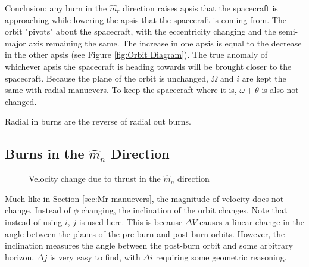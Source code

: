 \documentclass{article}
\begin{document}
Conclusion: any burn in the $\hat{m}_r$ direction raises apsis that the spacecraft is approaching while lowering the apsis that the spacecraft is coming from. The orbit "pivots" about the spacecraft, with the eccentricity changing and the semi-major axis remaining the same. The increase in one apsis is equal to the decrease in the other apsis (see Figure \ref{fig:Orbit Diagram}). The true anomaly of whichever apsis the spacecraft is heading towards will be brought closer to the spacecraft. Because the plane of the orbit is unchanged, $\Omega$ and $i$ are kept the same with radial manuevers. To keep the spacecraft where it is, $\omega+\theta$ is also not changed.

Radial in burns are the reverse of radial out burns.

\bigskip\bigskip
\subsection{Burns in the \texorpdfstring{$\hat{m}_n$}{Normal} Direction}\label{sec:Mn Manuever}

\begin{figure}[H]
    \centering
    \caption{Velocity change due to thrust in the $\hat{m}_n$ direction}\label{fig:dV Triangle Mn}
\end{figure}

Much like in Section \ref{sec:Mr manuevers}, the magnitude of velocity does not change. Instead of $\phi$ changing, the inclination of the orbit changes. Note that instead of using $i$, $j$ is used here. This is because $\Delta V$ causes a linear change in the angle between the planes of the pre-burn and post-burn orbits. However, the inclination measures the angle between the post-burn orbit and some arbitrary horizon. $\Delta j$ is very easy to find, with $\Delta i$ requiring some geometric reasoning.
\end{document}
